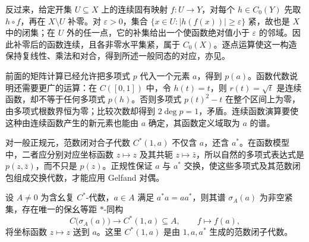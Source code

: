\ProseParagraphBreak
反过来，给定开集 \(U\subseteq X\) 上的连续固有映射 \(f:U\to Y\)，对每个 \(h\in C_0(Y)\) 先取 \(h\circ f\)，再在 \(X\setminus U\) 补零。对 \(\varepsilon>0\)，集合 \(\{x\in U:|h(f(x))|\ge\varepsilon\}\) 紧，故也是 \(X\) 中的闭集；在 \(U\) 外的任一点，它的补集给出一个使函数绝对值小于 \(\varepsilon\) 的邻域。因此补零后的函数连续，且各非零水平集紧，属于 \(C_0(X)\)。逐点运算使这一构造保持复线性、乘法和对合，得到所述一般同态的对应，亦见\cite[\nopp II.2.2.7--II.2.2.8]{Blackadar2017OperatorAlgebrasCorrected}。

\ProseParagraphBreak
前面的矩阵计算已经允许把多项式 \(p\) 代入一个元素 \(a\)，得到 \(p(a)\)。函数代数说明还需要更广的运算：在 \(C([0,1])\) 中，令 \(h(t)=t\)，则 \(r(t)=\sqrt t\) 是连续函数，却不等于任何多项式 \(p(h)\)。否则多项式 \(p(t)^2-t\) 在整个区间上为零，由多项式根数界恒为零；比较次数却得到 \(2\deg p=1\)，矛盾。连续函数演算要使这种由连续函数产生的新元素也能由 \(a\) 确定，其函数定义域取为 \(a\) 的谱。

\ProseParagraphBreak
对一般正规元，范数闭对合子代数 \(C^*(1,a)\) 不仅含 \(a\)，还含 \(a^*\)。在函数模型中，二者应分别对应坐标函数 \(z\mapsto z\) 及其共轭 \(z\mapsto\bar z\)，所以自然的多项式表达式是 \(p(z,\bar z)\)，而不只是 \(p(z)\)。正规性保证 \(a\) 与 \(a^*\) 交换，使这些多项式及其范数闭包组成交换代数，才能应用 Gelfand 对偶。

\begin{theorem}[连续函数演算]\label{b2:thm:continuous-functional-calculus}
	设 \(A\ne0\) 为含幺复 \(C^*\)-代数，\(a\in A\) 满足 \(a^*a=aa^*\)，则其谱 \(\sigma_A(a)\) 为非空紧集，存在唯一的保幺等距 \(*\)-同构
	\[
		C\bigl(\sigma_A(a)\bigr)\longrightarrow C^*(1,a)\subseteq A, \qquad f\longmapsto f(a),
	\]
	将坐标函数 \(z\mapsto z\) 送到 \(a\)。这里 \(C^*(1,a)\) 是由 \(1,a,a^*\) 生成的范数闭子代数。
\end{theorem}

